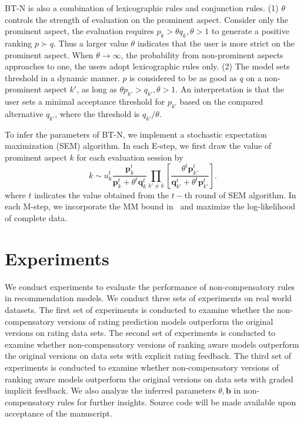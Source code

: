 \documentclass[letterpaper]{article} %
\begin{document}
BT-N is also a combination of lexicographic rules and conjunction rules. (1) $\theta$ controls the strength of evaluation on the prominent aspect. Consider only the prominent aspect, the evaluation requires $p_{k} > \theta q_{k}, \theta>1$ to generate a positive ranking $p\succ q$. Thus a larger value $\theta$ indicates that the user is more strict on the prominent aspect. When $\theta \rightarrow \infty$, the probability from non-prominent aspects  approaches to one, the users adopt lexicographic rules only. (2) The model sets threshold in a dynamic manner. $p$ is considered to be as good as $q$ on a non-prominent aspect $k'$, as long as $\theta p_{k'} >  q_{k'},\theta>1$.  An interpretation is that the user sets a minimal acceptance threshold for $p_{k'}$ based on the compared alternative $q_{k'}$, where the threshold is $q_{k'}/\theta$.  

To infer the parameters of BT-N, we implement a stochastic expectation maximization (SEM) algorithm. In each E-step, we first draw the value of prominent aspect $k$ for each evaluation session by
 \begin{equation}
 k \sim u_k^{t} \frac{\mathbf{p}_{k}^t} {\mathbf{p}_{k}^t+\theta^t \mathbf{q}_{k}^t} \prod_{k'\neq k}  [\frac{\theta^t \mathbf{p}_{k'}^t} {\mathbf{q}_{k'}^t + \theta^t \mathbf{p}_{k'}^t}].
 \end{equation}
 where $t$ indicates the value obtained from the $t-$th round of SEM algorithm.
 In each M-step, we incorporate the MM bound in~\cite{Hunter2004MM} and maximize the log-likelihood of complete data. 




\section{Experiments}\label{sec:experiment}
We conduct experiments to evaluate the performance of non-compensatory rules in recommendation models. We conduct three sets of experiments on real world datasets. The first set of experiments is conducted to examine whether the non-compensatory versions of rating prediction models outperform the original versions on rating data sets. 
The second set of experiments is conducted to examine whether non-compensatory versions of ranking aware models outperform the original versions on data sets with explicit rating feedback.
The third set of experiments is conducted to examine whether non-compensatory versions of ranking aware models outperform the original versions on data sets with graded implicit feedback. We also analyze the inferred parameters $\theta,\mathbf{b}$ in non-compensatory rules for further insights. Source code will be made available upon acceptance of the manuscript.
\end{document}
